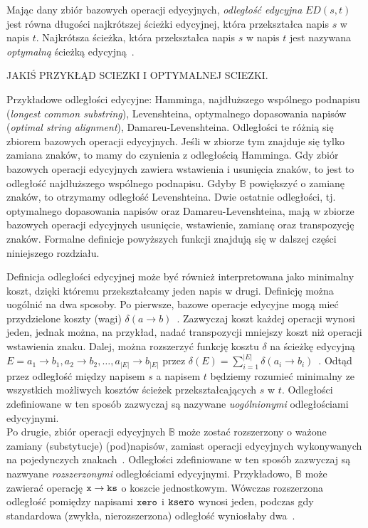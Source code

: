 \documentclass{praca1}
\begin{document}
\begin{definition}
Mając dany zbiór bazowych operacji edycyjnych, \emph{odległość edycyjna} $ED(s,t)$ jest równa długości najkrótszej ścieżki edycyjnej, która przekształca napis $s$ w napis $t$. Najkrótsza ścieżka, która przekształca napis $s$ w napis $t$ jest nazywana \emph{optymalną} ścieżką edycyjną~\cite{Boytsov2011:indexingmethods}. 
\end{definition}

\begin{example}
JAKIŚ PRZYKŁĄD SCIEZKI I OPTYMALNEJ SCIEZKI.
\end{example}

Przykładowe odległości edycyjne: Hamminga, najdłuższego wspólnego podnapisu (\emph{longest common substring}), Levenshteina, optymalnego dopasowania napisów (\emph{optimal string alignment}), Damareu-Levenshteina. Odległości te różnią się zbiorem bazowych operacji edycyjnych. Jeśli w zbiorze tym znajduje się tylko zamiana znaków, to mamy do czynienia z odległością Hamminga. Gdy zbiór bazowych operacji edycyjnych zawiera wstawienia i usunięcia znaków, to jest to odległość najdłuższego wspólnego podnapisu. Gdyby $\mathbb{B}$ powiększyć o zamianę znaków, to otrzymamy odległość Levenshteina. Dwie ostatnie odległości, tj. optymalnego dopasowania napisów oraz Damareu-Levenshteina, mają w zbiorze bazowych operacji edycyjnych usunięcie, wstawienie, zamianę oraz transpozycję znaków. Formalne definicje powyższych funkcji znajdują się w dalszej części niniejszego rozdziału.




Definicja odległości edycyjnej może być również interpretowana jako minimalny koszt, dzięki któremu przekształcamy jeden napis w drugi. Definicję można uogólnić na dwa sposoby. Po pierwsze, bazowe operacje edycyjne mogą mieć przydzielone koszty (wagi) $\delta(a \rightarrow b)$~\cite{Wagner1974:stringtostring}. Zazwyczaj koszt każdej operacji wynosi jeden, jednak można, na przykład, nadać transpozycji mniejszy koszt niż operacji wstawienia znaku. Dalej, można rozszerzyć funkcję kosztu $\delta$ na ścieżkę edycyjną $E = a_1 \rightarrow b_1, a_2 \rightarrow b_2, \ldots, a_{|E|} \rightarrow b_{|E|}$ przez $\delta(E) = \sum\limits_{i=1}^{|E|}\delta(a_i \rightarrow b_i)$~\cite{Boytsov2011:indexingmethods}. Odtąd przez odległość między napisem $s$ a napisem $t$ będziemy rozumieć minimalny ze wszystkich możliwych kosztów ścieżek przekształcających $s$ w $t$. Odległości zdefiniowane w ten sposób zazwyczaj są nazywane \emph{uogólnionymi} odległościami edycyjnymi.\\
Po drugie, zbiór operacji edycyjnych $\mathbb{B}$ może zostać rozszerzony o ważone zamiany (substytucje) (pod)napisów, zamiast operacji edycyjnych wykonywanych na pojedynczych znakach~\cite{Ukkonen1985:algorithmsforapprox}. Odległości zdefiniowane w ten sposób zazwyczaj są nazwyane \emph{rozszerzonymi} odległościami edycyjnymi. Przykładowo, $\mathbb{B}$ może zawierać operację $\verb|x| \rightarrow \verb|ks|$ o koszcie jednostkowym. Wówczas rozszerzona odległość pomiędzy napisami $\verb|xero|$ i $\verb|ksero|$ wynosi jeden, podczas gdy standardowa (zwykła, nierozszerzona) odległość wyniosłaby dwa~\cite{Boytsov2011:indexingmethods}.
\end{document}
